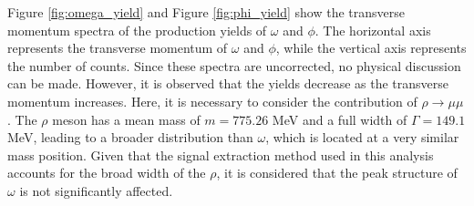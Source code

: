     Figure \ref{fig:omega_yield} and Figure \ref{fig:phi_yield} show the transverse momentum spectra of the production yields of $\omega$ and $\phi$. The horizontal axis represents the transverse momentum of $\omega$ and $\phi$, while the vertical axis represents the number of counts.
    Since these spectra are uncorrected, no physical discussion can be made. However, it is observed that the yields decrease as the transverse momentum increases. 
    Here, it is necessary to consider the contribution of $\rho \rightarrow \mu\mu$. The $\rho$ meson has a mean mass of $m = 775.26$ MeV and a full width of $\Gamma = 149.1$ MeV, leading to a broader distribution than $\omega$, which is located at a very similar mass position. Given that the signal extraction method used in this analysis accounts for the broad width of the $\rho$, it is considered that the peak structure of $\omega$ is not significantly affected.  
    
